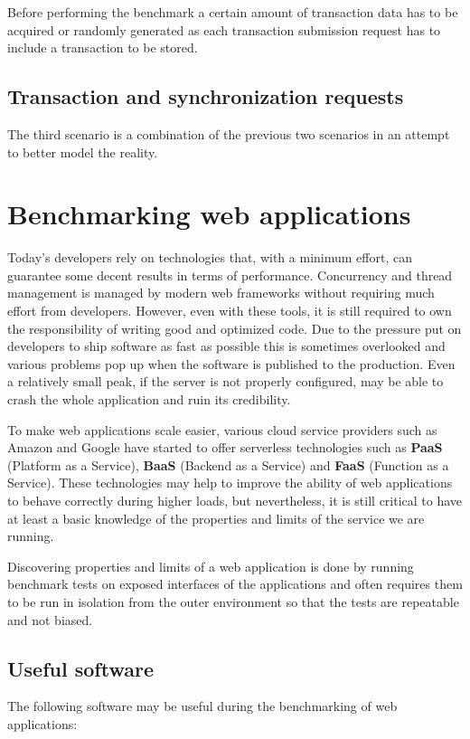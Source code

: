 \documentclass[12pt, a4paper]{article}
\let\oldsection\section
\renewcommand\section{\clearpage\oldsection}
\begin{document}
Before performing the benchmark a certain amount of transaction data has to be acquired or randomly generated as each transaction submission request has to include a transaction to be stored. 

\subsection{Transaction and synchronization requests}
The third scenario is a combination of the previous two scenarios in an attempt to better model the reality. 

\section{Benchmarking web applications}
Today's developers rely on technologies that, with a minimum effort, can guarantee some decent results in terms of performance.
Concurrency and thread management is managed by modern web frameworks without requiring much effort from developers. 
However, even with these tools, it is still required to own the responsibility of writing good and optimized code.
Due to the pressure put on developers to ship software as fast as possible this is sometimes overlooked and various problems pop up when the software is published to the production.
Even a relatively small peak, if the server is not properly configured, may be able to crash the whole application and ruin its credibility.

To make web applications scale easier, various cloud service providers such as Amazon and Google have started to offer serverless technologies such as \textbf{PaaS} (Platform as a Service), \textbf{BaaS} (Backend as a Service) and \textbf{FaaS} (Function as a Service).
These technologies may help to improve the ability of web applications to behave correctly during higher loads, but nevertheless, it is still critical to have at least a basic knowledge of the properties and limits of the service we are running. 

Discovering properties and limits of a web application is done by running benchmark tests on exposed interfaces of the applications and often requires them to be run in isolation from the outer environment so that the tests are repeatable and not biased.

\subsection{Useful software}
The following software may be useful during the benchmarking of web applications:
\end{document}

